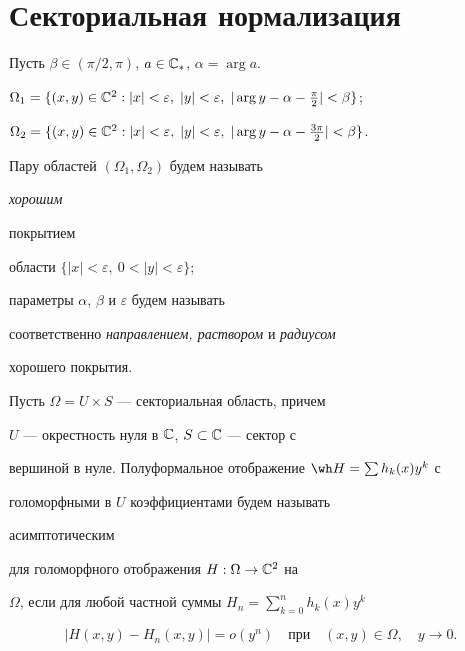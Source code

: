 \section{Секториальная нормализация}





Пусть $\beta\in (\pi/2,\pi)$, $a\in\Bbb C_*$, $\alpha=\arg a$.





$\Omega_1=\{(x,y)\in\Bbb C^2: |x|<\varepsilon,\; |y|<\varepsilon,\;


|\arg y-\alpha -\frac{\pi}{2}|<\beta \}$;





$\Omega_2=\{(x,y)\in\Bbb C^2: |x|<\varepsilon,\; |y|<\varepsilon,\;


|\arg y-\alpha-\frac{3\pi}{2}|<\beta \}$.





\noindent{}Пару областей $(\Omega_1,\Omega_2)$ будем называть {\it хорошим


покрытием} области $\{|x|<\varepsilon,\ 0<|y|<\varepsilon\}$;


параметры $\alpha$, $\beta$ и $\varepsilon$ будем называть


соответственно {\it направлением, раствором} и {\it радиусом}


хорошего покрытия.





\begin{defn}


Пусть $\Omega=U\times S$ --- секториальная область, причем


$U$ --- окрестность нуля в $\Bbb C$, $S\subset \Bbb C$ --- сектор с


вершиной в нуле. Полуформальное отображение $\wh H=\sum h_k(x)y^k$ с


голоморфными в $U$ коэффициентами будем называть {\it


асимптотическим} для голоморфного отображения $H:\Omega\to\Bbb C^2$ на


$\Omega$, если для любой частной суммы $H_n=\sum\limits^n_{k=0}h_k(x)y^k$


$$


|{H(x,y)-H_n(x,y)}|=o(y^n) \quad \text{при}\quad


(x,y)\in\Omega,\quad y\to 0.


$$


\end{defn}





